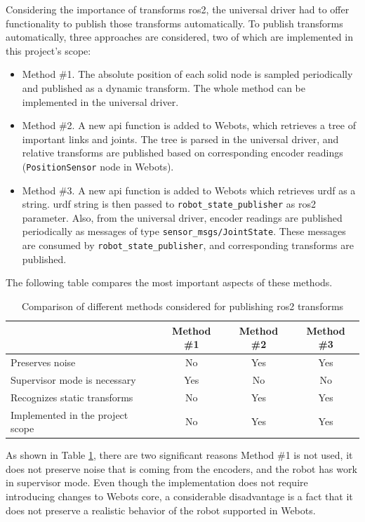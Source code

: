 Considering the importance of transforms \ac{ros2}, the universal driver had to offer functionality to publish those transforms automatically. To publish transforms automatically, three approaches are considered, two of which are implemented in this project's scope:
\begin{itemize}
    \item Method \#1. The absolute position of each solid node is sampled periodically and published as a dynamic transform. The whole method can be implemented in the universal driver.
    \item Method \#2. A new \ac{api} function is added to Webots, which retrieves a tree of important links and joints. The tree is parsed in the universal driver, and relative transforms are published based on corresponding encoder readings (\texttt{PositionSensor} node in Webots). 
    \item Method \#3. A new \ac{api} function is added to Webots which retrieves \ac{urdf} as a string. \ac{urdf} string is then passed to \texttt{robot\_state\_publisher} as \ac{ros2} parameter. Also, from the universal driver, encoder readings are published periodically as messages of type \texttt{sensor\_msgs/JointState}. These messages are consumed by \texttt{robot\_state\_publisher}, and corresponding transforms are published.
\end{itemize}

The following table compares the most important aspects of these methods.

\begin{table}[H]
    \centering
    \begin{tabular}{|l|c|c|c|}
        \hline
        & Method \#1 & Method \#2 & Method \#3  \\
        \hline
        Preserves noise & No & Yes & Yes \\
        \hline
        Supervisor mode is necessary & Yes & No & No \\
        \hline
        Recognizes static transforms & No & Yes & Yes \\
        \hline
        Implemented in the project scope & No & Yes & Yes \\
        \hline
    \end{tabular}
    \caption{Comparison of different methods considered for publishing \ac{ros2} transforms}
    \label{tab:generalization:transforms_comparison}
\end{table}

As shown in Table \ref{tab:generalization:transforms_comparison}, there are two significant reasons Method \#1 is not used, it does not preserve noise that is coming from the encoders, and the robot has work in supervisor mode. Even though the implementation does not require introducing changes to Webots core, a considerable disadvantage is a fact that it does not preserve a realistic behavior of the robot supported in Webots.

